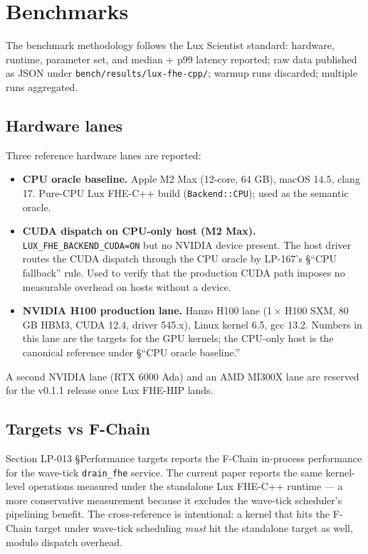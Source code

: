 \section{Benchmarks}
\label{sec:fhe-benchmarks}

The benchmark methodology follows the Lux Scientist standard: hardware,
runtime, parameter set, and median + p99 latency reported; raw data
published as JSON under \texttt{bench/results/lux-fhe-cpp/}; warmup
runs discarded; multiple runs aggregated.

\subsection{Hardware lanes}

Three reference hardware lanes are reported:

\begin{itemize}
\item \textbf{CPU oracle baseline.} Apple M2 Max (12-core, 64 GB), macOS
14.5, clang 17. Pure-CPU Lux FHE-C++ build (\texttt{Backend::CPU}); used
as the semantic oracle.
\item \textbf{CUDA dispatch on CPU-only host (M2 Max).}
\texttt{LUX\_FHE\_BACKEND\_CUDA=ON} but no NVIDIA device present. The
host driver routes the CUDA dispatch through the CPU oracle by LP-167's
\S``CPU fallback'' rule. Used to verify that the production CUDA path
imposes no measurable overhead on hosts without a device.
\item \textbf{NVIDIA H100 production lane.} Hanzo H100 lane (1\,$\times$
H100 SXM, 80 GB HBM3, CUDA 12.4, driver 545.x), Linux kernel 6.5,
gcc 13.2. Numbers in this lane are the targets for the GPU kernels;
the CPU-only host is the canonical reference under
\S``CPU oracle baseline.''
\end{itemize}

A second NVIDIA lane (RTX 6000 Ada) and an AMD MI300X lane are reserved
for the v0.1.1 release once Lux FHE-HIP lands.

\subsection{Targets vs F-Chain}

Section LP-013 \S Performance targets reports the F-Chain in-process
performance for the wave-tick \texttt{drain\_fhe} service. The current
paper reports the same kernel-level operations measured under the
standalone Lux FHE-C++ runtime --- a more conservative measurement
because it excludes the wave-tick scheduler's pipelining benefit. The
cross-reference is intentional: a kernel that hits the F-Chain target
under wave-tick scheduling \emph{must} hit the standalone target as
well, modulo dispatch overhead.

